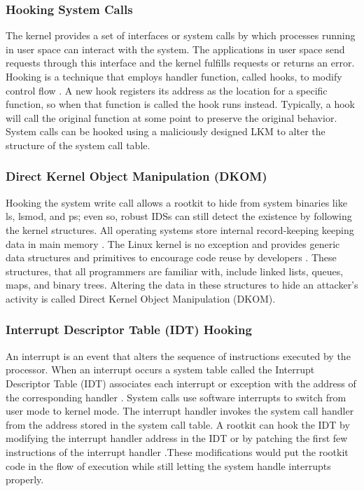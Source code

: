 \subsubsection{Hooking System Calls}
The kernel provides a set  of  interfaces or system calls by which processes running
 in user space can interact with the system. The applications in user space send requests
 through this interface and the kernel fulfills requests or returns an error. Hooking is a technique that employs handler function, called hooks, to modify
 control flow . A new hook registers its address as the location for a specific
function, so when that function is called the hook runs instead. Typically, a hook will call
 the original function at some point to preserve the original behavior. System calls can be
 hooked using a maliciously designed LKM to alter the structure of the system call table.

\subsubsection{Direct Kernel Object Manipulation (DKOM)}
Hooking the system write call allows a rootkit to hide from system binaries like
 ls, lsmod, and ps; even so, robust IDSs can still detect the existence by following the
 kernel structures. All operating systems store internal record-keeping
 keeping data in main
 memory . The Linux kernel is no exception and provides generic data structures
 and primitives to encourage code reuse by developers . These structures, that all
 programmers are familiar with, include linked lists, queues, maps, and binary trees.
 Altering the data in these structures to hide an attacker’s activity is called Direct Kernel
 Object Manipulation (DKOM).

\subsubsection{Interrupt Descriptor Table (IDT) Hooking}
An interrupt is an event that alters the sequence of instructions executed by the
 processor. When an interrupt occurs a system table called the Interrupt Descriptor Table
 (IDT) associates each interrupt or exception with the address of the corresponding
 handler . System calls use software interrupts to switch from user mode to kernel
 mode. The interrupt handler invokes the system call handler from the address stored in
 the system call table. A rootkit can hook the IDT by modifying the interrupt handler
 address in the IDT or by patching the first few instructions of the interrupt handler
.These modifications would put the rootkit code in the flow of execution while
 still letting the system handle interrupts properly.